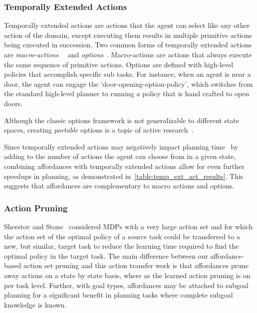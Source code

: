 \documentclass[letterpaper]{article}
\newcommand{\enote}[1]{\textcolor{Red}{\textbf{}}}
\begin{document}
\subsubsection{Temporally Extended Actions}
Temporally extended actions are actions that the agent can
select like any other action of the domain, except executing them
results in multiple primitive actions being executed in
succession. Two common forms of temporally extended actions are {\em
  macro-actions}~\cite{hauskrecht98} ~and {\em options}~\cite{sutton99}. 
Macro-actions are actions that always
execute the same sequence of primitive actions. Options are defined
with high-level policies that accomplish specific sub tasks. For
instance, when an agent is near a door, the agent can engage the
`door-opening-option-policy', which switches from the standard
high-level planner to running a policy that is hand crafted to open
doors. 

Although the classic options framework is not generalizable to different state spaces,
creating {\em portable} options is a topic of active research~\cite{konidaris07,konidaris2009efficient,Ravindran03analgebraic,croonenborghs2008learning,andre2002state,konidaris2012transfer}.

Since temporally extended actions may negatively impact planning time~\cite{Jong:2008zr} by adding to the number of actions the agent can choose from in a given state, combining affordances with temporally extended actions allow for even further speedups in planning, as demonstrated in~\ref{table:temp_ext_act_results}. This suggests that affordances are complementary to macro actions and options.

\subsubsection{Action Pruning}

Sherstov and Stone~\cite{sherstov2005improving} considered MDPs with a very large 
action set and for which the action set of the optimal policy of a source task could be 
transferred to a new, but similar, target task to reduce the learning time required to find
the optimal policy in the target task. The main difference between our affordance-based 
action set pruning and this action transfer work is that affordances prune away actions on 
a state by state basis, where as the learned action pruning is on per task level. Further, 
with goal types\enote{This is the first time we are now talking about LGD?}, affordances may be attached to subgoal planning for a significant
benefit in planning tasks where complete subgoal knowledge is known.
\end{document}
